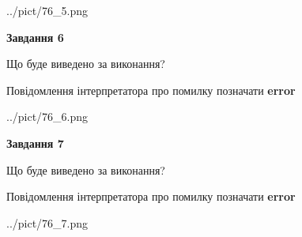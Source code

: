 \documentclass[10pt, ukrainian]{article}
\begin{document}
{\begin {large}
\begin{center}
	{../pict/76_5.png}
\end{center}
\newpage

{\begin {center}\textbf{Завдання 6}\end {center}}\par
Що буде виведено за виконання? \par
Повідомлення інтерпретатора про помилку позначати \textbf{error}

\begin{center}
	{../pict/76_6.png}
\end{center}
\newpage

{\begin {center}\textbf{Завдання 7}\end {center}}\par
Що буде виведено за виконання? \par
Повідомлення інтерпретатора про помилку позначати \textbf{error}

\begin{center}
	{../pict/76_7.png}
\end{center}
\newpage

\end {large}}
\end{document}
